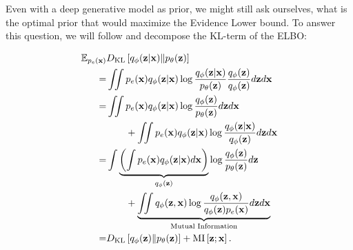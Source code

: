 Even with a deep generative model as prior, we might still ask ourselves, what is the optimal prior that would maximize the Evidence Lower bound. 
To answer this question, we will follow \citet{hoffman2016elbo} and decompose the KL-term of the ELBO:

\begin{align}
\mathbb{E}_{p_e({\mathbf{x}})} &D_{\mathrm{KL}}\left[q_{\phi}({\mathbf{z}}|{\mathbf{x}})\|p_{\theta}({\mathbf{z}})\right] \\
=& \iint p_e({\mathbf{x}}) q_{\phi}({\mathbf{z}}|{\mathbf{x}}) \log \frac{q_{\phi}({\mathbf{z}}|{\mathbf{x}})}{p_{\theta}({\mathbf{z}})}\frac{q_{\phi}({\mathbf{z}})}{q_{\phi}({\mathbf{z}})}d{\mathbf{z}} d{\mathbf{x}} \\
 =&\iint p_e({\mathbf{x}})  q_{\phi}({\mathbf{z}}|{\mathbf{x}}) \log \frac{q_{\phi}({\mathbf{z}})}{p_{\theta}({\mathbf{z}})}d{\mathbf{z}}  d{\mathbf{x}} \notag\\
&\quad\quad + \iint p_e({\mathbf{x}}) q_{\phi}({\mathbf{z}}|{\mathbf{x}}) \log \frac{q_{\phi}({\mathbf{z}}|{\mathbf{x}})}{q_{\phi}({\mathbf{z}})}d{\mathbf{z}}  d{\mathbf{x}} \\
 =&  \int\underbrace{\left( \int p_{e}({\mathbf{x}}) q_{\phi}({\mathbf{z}}|{\mathbf{x}})d{\mathbf{x}}\right)}_{q_{\phi}({\mathbf{z}})} \log \frac{q_{\phi}({\mathbf{z}})}{p_{\theta}({\mathbf{z}})}d{\mathbf{z}} \notag\\
&\quad\quad+ \underbrace{\iint q_{\phi}({\mathbf{z}}, {\mathbf{x}}) \log \frac{q_{\phi}({\mathbf{z}}, {\mathbf{x}})}{q_{\phi}({\mathbf{z}})p_{e}({\mathbf{x}})}d{\mathbf{z}}  d{\mathbf{x}}}_{\text{Mutual Information}} \\
 =&  D_{\mathrm{KL}}\left[q_{\phi}({\mathbf{z}})\|p_{\theta}({\mathbf{z}})\right]
+ \text{MI}\left[{\mathbf{z}}; {\mathbf{x}}\right].
\end{align}

